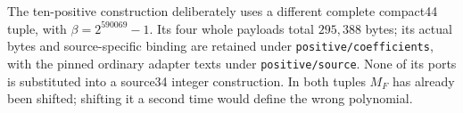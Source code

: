 The ten-positive construction deliberately uses a different complete
compact44 tuple, with $\beta=2^{590069}-1$. Its four whole payloads total
$295{,}388$ bytes; its actual bytes and source-specific binding are retained under
\texttt{positive/coefficients}, with the pinned ordinary adapter texts
under \texttt{positive/source}. None of its ports is substituted
into a source34 integer construction. In both tuples $M_F$ has already been
shifted; shifting it a second time would define the wrong polynomial.
